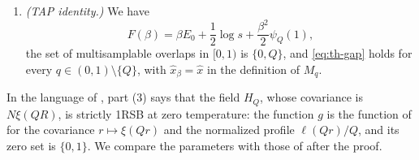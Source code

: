\begin{proposition}
\begin{enumerate}
\begin{equation}
\end{equation}
and
\begin{equation}\label{eq:th-edge}
\frac{b_Q}{y^2}=\beta^2s^2\xi''(Q)<1,\qquad K_0-2\sqrt{b_Q}=\frac{(y-\sqrt{b_Q})^2}y>0.
\end{equation}
\item \emph{(TAP identity.)} We have
\begin{equation}\label{eq:th-TAP}
F(\beta)=\beta E_0+\frac12\log s+\frac{\beta^2}2\psi_Q(1),
\end{equation}
the set of multisamplable overlaps in $[0,1)$ is $\{0,Q\}$, and \eqref{eq:th-gap} holds for every $q\in(0,1)\setminus\{Q\}$, with $\hat x_\beta=\hat x$ in the definition of $M_q$.
\end{enumerate}
\end{proposition}

In the language of \cite[Definition~4]{HuangSellke2024}, part (3) says that the field $H_Q$, whose covariance is $N\xi(QR)$, is strictly 1RSB at zero temperature: the function $g$ is the function of \cite[(2.3)]{HuangSellke2024} for the covariance $r\mapsto\xi(Qr)$ and the normalized profile $\ell(Qr)/Q$, and its zero set is $\{0,1\}$. We compare the parameters with those of \cite{HuangSellke2024} after the proof.


